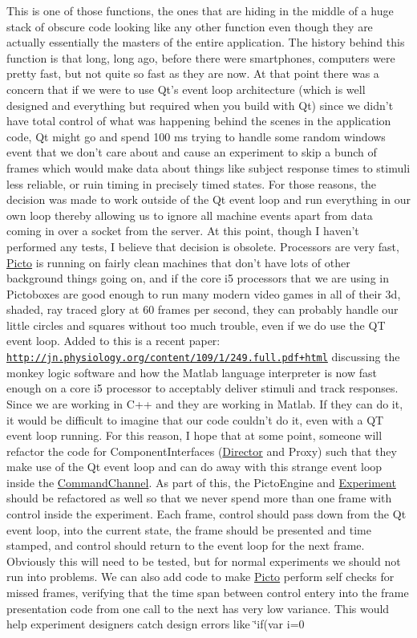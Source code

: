 This is one of those functions, the ones that are hiding in the middle of a huge stack of obscure code looking like any other function even though they are actually essentially the masters of the entire application. The history behind this function is that long, long ago, before there were smartphones, computers were pretty fast, but not quite so fast as they are now. At that point there was a concern that if we were to use Qt's event loop architecture (which is well designed and everything but required when you build with Qt) since we didn't have total control of what was happening behind the scenes in the application code, Qt might go and spend 100 ms trying to handle some random windows event that we don't care about and cause an experiment to skip a bunch of frames which would make data about things like subject response times to stimuli less reliable, or ruin timing in precisely timed states. For those reasons, the decision was made to work outside of the Qt event loop and run everything in our own loop thereby allowing us to ignore all machine events apart from data coming in over a socket from the server. At this point, though I haven't performed any tests, I believe that decision is obsolete. Processors are very fast, \hyperlink{namespace_picto}{Picto} is running on fairly clean machines that don't have lots of other background things going on, and if the core i5 processors that we are using in Pictoboxes are good enough to run many modern video games in all of their 3d, shaded, ray traced glory at 60 frames per second, they can probably handle our little circles and squares without too much trouble, even if we do use the Q\-T event loop. Added to this is a recent paper\-: \href{http://jn.physiology.org/content/109/1/249.full.pdf+html}{\tt http\-://jn.\-physiology.\-org/content/109/1/249.\-full.\-pdf+html} discussing the monkey logic software and how the Matlab language interpreter is now fast enough on a core i5 processor to acceptably deliver stimuli and track responses. Since we are working in C++ and they are working in Matlab. If they can do it, it would be difficult to imagine that our code couldn't do it, even with a Q\-T event loop running. For this reason, I hope that at some point, someone will refactor the code for Component\-Interfaces (\hyperlink{class_director}{Director} and Proxy) such that they make use of the Qt event loop and can do away with this strange event loop inside the \hyperlink{class_picto_1_1_command_channel}{Command\-Channel}. As part of this, the Picto\-Engine and \hyperlink{class_picto_1_1_experiment}{Experiment} should be refactored as well so that we never spend more than one frame with control inside the experiment. Each frame, control should pass down from the Qt event loop, into the current state, the frame should be presented and time stamped, and control should return to the event loop for the next frame. Obviously this will need to be tested, but for normal experiments we should not run into problems. We can also add code to make \hyperlink{namespace_picto}{Picto} perform self checks for missed frames, verifying that the time span between control entery into the frame presentation code from one call to the next has very low variance. This would help experiment designers catch design errors like \char`\"{}if(var i=0 